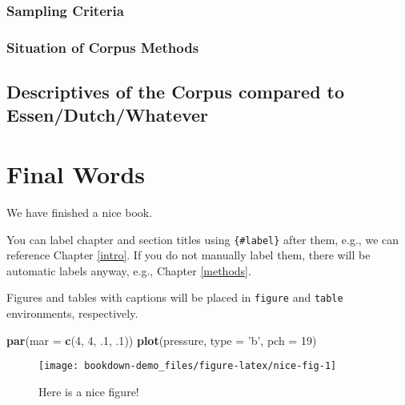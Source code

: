 \documentclass[]{book}
\newenvironment{Shaded}{\begin{snugshade}}{\end{snugshade}}
\newcommand{\DataTypeTok}[1]{\textcolor[rgb]{0.13,0.29,0.53}{#1}}
\newcommand{\DecValTok}[1]{\textcolor[rgb]{0.00,0.00,0.81}{#1}}
\newcommand{\FloatTok}[1]{\textcolor[rgb]{0.00,0.00,0.81}{#1}}
\newcommand{\KeywordTok}[1]{\textcolor[rgb]{0.13,0.29,0.53}{\textbf{#1}}}
\newcommand{\NormalTok}[1]{#1}
\newcommand{\StringTok}[1]{\textcolor[rgb]{0.31,0.60,0.02}{#1}}
\theoremstyle{definition}
\theoremstyle{definition}
\theoremstyle{definition}
\theoremstyle{remark}
\begin{document}
\hypertarget{sampling-criteria}{%
\subsection{Sampling Criteria}\label{sampling-criteria}}

\hypertarget{situation-of-corpus-methods}{%
\subsection{Situation of Corpus
Methods}\label{situation-of-corpus-methods}}

\hypertarget{descriptives-of-the-corpus-compared-to-essendutchwhatever}{%
\section{Descriptives of the Corpus compared to
Essen/Dutch/Whatever}\label{descriptives-of-the-corpus-compared-to-essendutchwhatever}}

\hypertarget{final-words}{%
\chapter{Final Words}\label{final-words}}

We have finished a nice book.

You can label chapter and section titles using \texttt{\{\#label\}}
after them, e.g., we can reference Chapter \ref{intro}. If you do not
manually label them, there will be automatic labels anyway, e.g.,
Chapter \ref{methods}.

Figures and tables with captions will be placed in \texttt{figure} and
\texttt{table} environments, respectively.

\begin{Shaded}
\begin{Highlighting}[]
\KeywordTok{par}\NormalTok{(}\DataTypeTok{mar =} \KeywordTok{c}\NormalTok{(}\DecValTok{4}\NormalTok{, }\DecValTok{4}\NormalTok{, }\FloatTok{.1}\NormalTok{, }\FloatTok{.1}\NormalTok{))}
\KeywordTok{plot}\NormalTok{(pressure, }\DataTypeTok{type =} \StringTok{'b'}\NormalTok{, }\DataTypeTok{pch =} \DecValTok{19}\NormalTok{)}
\end{Highlighting}
\end{Shaded}

\begin{figure}

{\centering \texttt{[image: bookdown-demo\_files/figure-latex/nice-fig-1]} 

}

\caption{Here is a nice figure!}\label{fig:nice-fig}
\end{figure}
\end{document}
